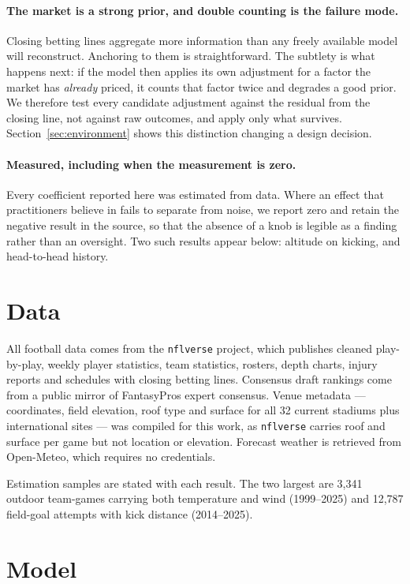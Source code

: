 \documentclass[11pt,a4paper]{article}
\begin{document}
\paragraph{The market is a strong prior, and double counting is the failure mode.}
Closing betting lines aggregate more information than any freely available model
will reconstruct. Anchoring to them is straightforward. The subtlety is what
happens next: if the model then applies its own adjustment for a factor the
market has \emph{already} priced, it counts that factor twice and degrades a
good prior. We therefore test every candidate adjustment against the residual
from the closing line, not against raw outcomes, and apply only what survives.
Section~\ref{sec:environment} shows this distinction changing a design decision.

\paragraph{Measured, including when the measurement is zero.}
Every coefficient reported here was estimated from data. Where an effect that
practitioners believe in fails to separate from noise, we report zero and retain
the negative result in the source, so that the absence of a knob is legible as a
finding rather than an oversight. Two such results appear below: altitude on
kicking, and head-to-head history.

\section{Data}

All football data comes from the \texttt{nflverse} project, which publishes
cleaned play-by-play, weekly player statistics, team statistics, rosters, depth
charts, injury reports and schedules with closing betting lines. Consensus draft
rankings come from a public mirror of FantasyPros expert consensus. Venue
metadata --- coordinates, field elevation, roof type and surface for all 32
current stadiums plus international sites --- was compiled for this work, as
\texttt{nflverse} carries roof and surface per game but not location or
elevation. Forecast weather is retrieved from Open-Meteo, which requires no
credentials.

Estimation samples are stated with each result. The two largest are 3{,}341
outdoor team-games carrying both temperature and wind (1999--2025) and 12{,}787
field-goal attempts with kick distance (2014--2025).

\section{Model}
\end{document}
